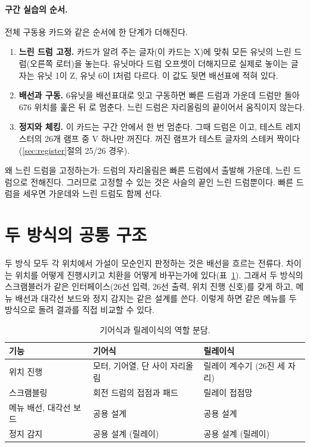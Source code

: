 \paragraph{구간 실습의 순서.} 전체 구동용 카드와 같은 순서에 한 단계가 더해진다.
\begin{enumerate}
\item \textbf{느린 드럼 고정.} 카드가 알려 주는 글자(이 카드는 X)에 맞춰 모든 유닛의 느린 드럼(오른쪽 로터)을
놓는다. 유닛마다 드럼 오프셋이 더해지므로 실제로 놓이는 글자는 유닛 1이 Z, 유닛 6이 I처럼 다르다. 이 값도
뒷면 배선표에 적혀 있다.
\item \textbf{배선과 구동.} 6유닛을 배선표대로 잇고 구동하면 빠른 드럼과 가운데 드럼만 돌아 676 위치를 훑은 뒤
로 멈춘다. 느린 드럼은 자리올림의 끝이어서 움직이지 않는다.
\item \textbf{정지와 체킹.} 이 카드는 구간 안에서 한 번 멈춘다. 그때 드럼은 이고, 테스트 레지스터의
26개 램프 중 V 하나만 꺼진다. 꺼진 램프가 테스트 글자의 스테커 짝이다(\ref{sec:register}절의 25/26 경우).
\end{enumerate}

왜 느린 드럼을 고정하는가: 드럼의 자리올림은 빠른 드럼에서 출발해 가운데, 느린 드럼으로 전해진다. 그러므로
고정할 수 있는 것은 사슬의 끝인 느린 드럼뿐이다. 빠른 드럼을 세우면 가운데와 느린 드럼도 함께 선다.

\section{두 방식의 공통 구조}\label{sec:hw-common}

두 방식 모두 각 위치에서 가설이 모순인지 판정하는 것은 배선을 흐르는 전류다. 차이는 위치를 어떻게
진행시키고 치환을 어떻게 바꾸는가에 있다(표~\ref{tab:tracks}). 그래서 두 방식의 스크램블러가 같은
인터페이스(26선 입력, 26선 출력, 위치 진행 신호)를 갖게 하고, 메뉴 배선과 대각선 보드와 정지 감지는
같은 설계를 쓴다. 이렇게 하면 같은 메뉴를 두 방식으로 돌려 결과를 직접 비교할 수 있다.

\begin{table}[ht]
\centering
\caption{기어식과 릴레이식의 역할 분담.}
\label{tab:tracks}
\begin{tabular}{lll}
\toprule
기능 & 기어식 & 릴레이식 \\
\midrule
위치 진행 & 모터, 기어열, 단 사이 자리올림 & 릴레이 계수기 (26진 세 자리) \\
스크램블링 & 회전 드럼의 접점과 패드 & 릴레이 접점망 \\
메뉴 배선, 대각선 보드 & 공용 설계 & 공용 설계 \\
정지 감지 & 공용 설계 (릴레이) & 공용 설계 (릴레이) \\
\bottomrule
\end{tabular}
\end{table}

